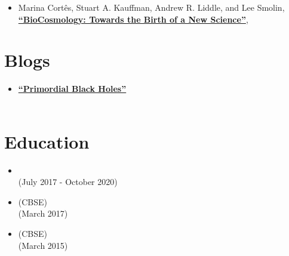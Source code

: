 \documentclass{My_CV}
\begin{document}
\begin{paracol}{2}
\begin{rightcolumn}
\begin{itemize}

    \item Marina Cortês, Stuart A. Kauffman, Andrew R. Liddle, and Lee Smolin, \href{https://www.biocosmology.earth/s/Paper1-FINAL.pdf}{\textbf{“BioCosmology: Towards the Birth of a New Science”}}, 
    
\end{itemize}



\section{{\faNewspaperO} Blogs}

\begin{itemize}
    \item \href{https://nssmumbai.blogspot.com/2022/02/primordial-black-holes.html}{\textbf{“Primordial Black Holes”}} \\
     \\
    
\end{itemize}



\section{{\faGraduationCap} Education}

\begin{itemize}
    
    \item {} \\
     \hfill{(July 2017 - October 2020)} \\
    
    \item {} {(CBSE)} \\
     \hfill{(March 2017)}
    
    \item {} {(CBSE)} \\
     \hfill{(March 2015)}


\end{itemize}
\end{rightcolumn}
\end{paracol}
\end{document}
